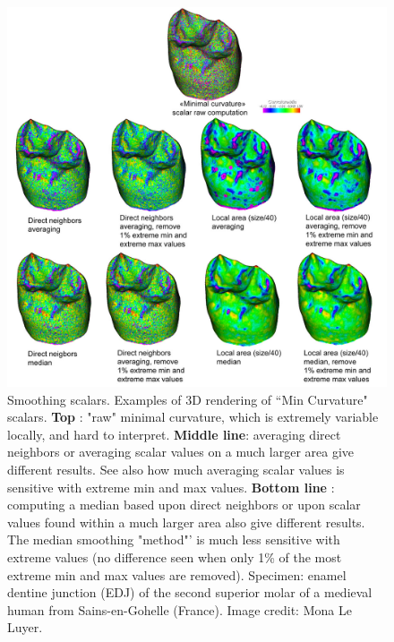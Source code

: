 \begin{figure}
  \centering
  \includegraphics[scale=0.4]{images/11/scalar_smoothing_example.jpg} 
	\caption{ 
Smoothing scalars. Examples of 3D rendering of ``Min Curvature" scalars. \textbf{Top} : "raw" minimal curvature, which is extremely variable locally, and hard to interpret.  \textbf{Middle line}: averaging direct neighbors  or averaging scalar values on a much larger area give different results. See also how much averaging scalar values is sensitive with extreme min and max values. \textbf{Bottom line} : computing a median based upon direct neighbors  or upon scalar values found within a much larger area also give different results. The median smoothing "method"' is much less sensitive with extreme values (no difference seen when only 1\% of the most extreme min and max values are removed).  Specimen: enamel dentine junction (EDJ) of the second superior molar of a medieval human from Sains-en-Gohelle (France). Image credit: Mona Le Luyer.	
	}
\label{smoothing_scalars_example}
\end{figure}


